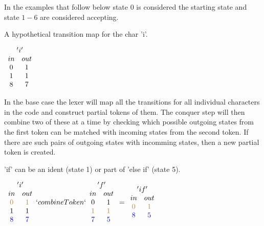In the examples that follow below state 0 is considered the starting state and
state $1-6$ are considered accepting.
\begin{example}\label{transMap}
A hypothetical transition map for the char 'i'.
\begin{center}$\begin{array}{cc}
\multicolumn{2}{c}{'i'}\\
in & out\\
0 & 1\\
1 & 1\\
8 & 7\\
\end{array}$\\
\end{center}
\end{example}
In the base case the lexer will map all the transitions for all individual
characters in the code and construct partial tokens of them. The conquer step
will then combine two of these at a time by checking which possible outgoing
states from the first token can be matched with incoming states from the second
token. If there are such pairs of outgoing states with incomming states, then a
new partial token is created.
\begin{example}\label{combTok}
'if' can be an ident (state 1) or part of 'else if' (state 5).
\begin{center}$\begin{array}{cc}
\multicolumn{2}{c}{'i'}\\
in & out\\
\textcolor{brown}{0} & \textcolor{brown}{1}\\
1 & 1\\
\textcolor{blue}{8} & \textcolor{blue}{7}\\
\end{array}
`combineToken`
\begin{array}{cc}\multicolumn{2}{c}{'f'}\\
in & out\\
0 & 1\\
\textcolor{brown}{1} & \textcolor{brown}{1}\\
\textcolor{blue}{7} & \textcolor{blue}{5}\\
\end{array}
=
\begin{array}{cc}\multicolumn{2}{c}{'if'}\\
in & out\\
\textcolor{brown}{0} & \textcolor{brown}{1}\\
\textcolor{blue}{8} & \textcolor{blue}{5}\\
\end{array}$\\
\end{center}
\end{example}
